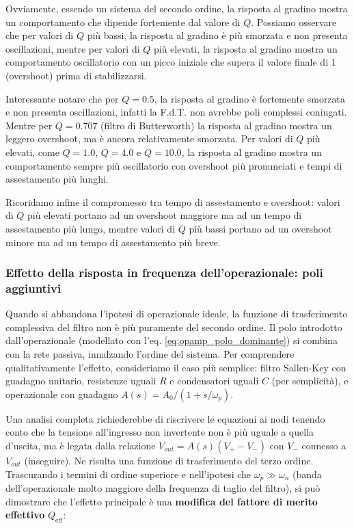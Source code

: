 Ovviamente, essendo un sistema del secondo ordine, la risposta al gradino mostra un comportamento che dipende fortemente dal valore di $Q$. Possiamo osservare che per valori di $Q$ più bassi, la risposta al gradino è più smorzata e non presenta oscillazioni, mentre per valori di $Q$ più elevati, la risposta al gradino mostra un comportamento oscillatorio con un picco iniziale che supera il valore finale di 1 (overshoot) prima di stabilizzarsi.

Interessante notare che per $Q = 0.5$, la risposta al gradino è fortemente smorzata e non presenta oscillazioni, infatti la F.d.T. non avrebbe poli complessi coniugati. Mentre per $Q = 0.707$ (filtro di Butterworth) la risposta al gradino mostra un leggero overshoot, ma è ancora relativamente smorzata. Per valori di $Q$ più elevati, come $Q = 1.0$, $Q = 4.0$ e $Q = 10.0$, la risposta al gradino mostra un comportamento sempre più oscillatorio con overshoot più pronunciati e tempi di assestamento più lunghi. 

Ricoridamo infine il compromesso tra tempo di assestamento e overshoot: valori di $Q$ più elevati portano ad un overshoot maggiore ma ad un tempo di assestamento più lungo, mentre valori di $Q$ più bassi portano ad un overshoot minore ma ad un tempo di assestamento più breve.



\subsubsection{Effetto della risposta in frequenza dell'operazionale: poli aggiuntivi}

Quando si abbandona l'ipotesi di operazionale ideale, la funzione di trasferimento complessiva del filtro non è più puramente del secondo ordine. Il polo introdotto dall'operazionale (modellato con l'eq. \ref{eq:opamp_polo_dominante}) si combina con la rete passiva, innalzando l'ordine del sistema. Per comprendere qualitativamente l'effetto, consideriamo il caso più semplice: filtro Sallen-Key con guadagno unitario, resistenze uguali \(R\) e condensatori uguali \(C\) (per semplicità), e operazionale con guadagno \(A(s) = A_0/(1+s/\omega_p)\).

Una analisi completa richiederebbe di riscrivere le equazioni ai nodi tenendo conto che la tensione all'ingresso non invertente non è più uguale a quella d'uscita, ma è legata dalla relazione \(V_{out} = A(s)(V_{+} - V_{-})\) con \(V_{-}\) connesso a \(V_{out}\) (inseguire). Ne risulta una funzione di trasferimento del terzo ordine. Trascurando i termini di ordine superiore e nell'ipotesi che \(\omega_p \gg \omega_n\) (banda dell'operazionale molto maggiore della frequenza di taglio del filtro), si può dimostrare che l'effetto principale è una \textbf{modifica del fattore di merito effettivo} \(Q_{\text{eff}}\):

